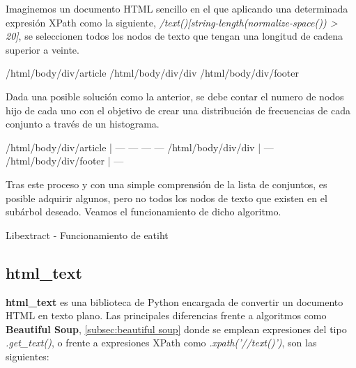 Imaginemos un documento HTML sencillo en el que aplicando una determinada expresión XPath como la siguiente,
\emph{/text()[string-length(normalize-space()) > 20]}, se seleccionen todos los nodos de texto que tengan 
una longitud de cadena superior a veinte.

\begin{Schunk}
  \begin{Soutput}
    /html/body/div/article
    /html/body/div/div
    /html/body/div/footer
  \end{Soutput}
\end{Schunk}

Dada una posible solución como la anterior, se debe contar el numero de nodos hijo de cada uno con el 
objetivo de crear una distribución de frecuencias de cada conjunto a través de un histograma.

\begin{Schunk}
  \begin{Soutput}
    /html/body/div/article   | — — — —
    /html/body/div/div       | —
    /html/body/div/footer    | —
  \end{Soutput}
\end{Schunk}

Tras este proceso y con una simple comprensión de la lista de conjuntos, es posible adquirir algunos, pero 
no todos los nodos de texto que existen en el subárbol deseado. Veamos el funcionamiento de dicho algoritmo.

\begin{codefloat}
  
  \caption{Libextract - Funcionamiento de eatiht}
  \label{cod:libextract - funcionamiento de eatiht}
\end{codefloat}

\subsection{html\_text}
\label{subsec:html_text}

\textbf{html\_text} \cite{html-text} es una biblioteca de Python encargada de convertir un documento HTML
en texto plano. Las principales diferencias frente a algoritmos como \textbf{Beautiful Soup},
\ref{subsec:beautiful soup} donde se emplean expresiones del tipo \emph{.get\_text()}, o frente a expresiones
XPath como \emph{.xpath('//text()')}, son las siguientes:

